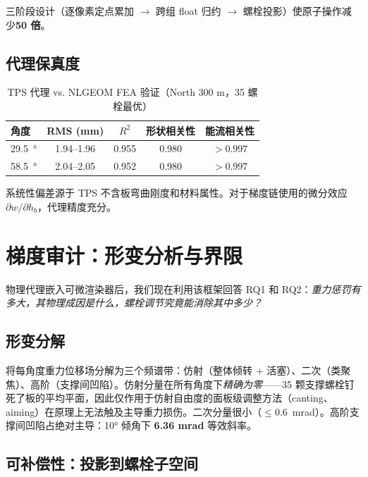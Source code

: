 \documentclass[12pt,a4paper]{ctexart}
\begin{document}
三阶段设计（逐像素定点累加 $\to$ 跨组 float 归约 $\to$ 螺栓投影）使原子操作减少\textbf{50 倍}。

\subsection{代理保真度}
\label{sec:proxy_fidelity}

\begin{table}[t]
\centering
\caption{TPS 代理 vs. NLGEOM FEA 验证（North 300 m，35 螺栓最优）}
\label{tab:proxy_fidelity}
\small
\begin{tabular}{lcccc}
\toprule
角度 & RMS (mm) & $R^2$ & 形状相关性 & 能流相关性 \\
\midrule
\SI{29.5}{\degree} & 1.94--1.96 & 0.955 & 0.980 & $>0.997$ \\
\SI{58.5}{\degree} & 2.04--2.05 & 0.952 & 0.980 & $>0.997$ \\
\bottomrule
\end{tabular}
\end{table}

系统性偏差源于 TPS 不含板弯曲刚度和材料属性。对于梯度链使用的微分效应 $\partial w / \partial h_b$，代理精度充分。

\section{梯度审计：形变分析与界限}
\label{sec:audit}

物理代理嵌入可微渲染器后，我们现在利用该框架回答 RQ1 和 RQ2：\emph{重力惩罚有多大，其物理成因是什么，螺栓调节究竟能消除其中多少？}

\subsection{形变分解}

将每角度重力位移场分解为三个频谱带：仿射（整体倾转 $+$ 活塞）、二次（类聚焦）、高阶（支撑间凹陷）。仿射分量在所有角度下\emph{精确为零}——35 颗支撑螺栓钉死了板的平均平面，因此仅作用于仿射自由度的面板级调整方法（canting、aiming）在原理上无法触及主导重力损伤。二次分量很小（$\le 0.6$~mrad）。高阶支撑间凹陷占绝对主导：10° 倾角下 \textbf{6.36 mrad} 等效斜率。

\subsection{可补偿性：投影到螺栓子空间}
\end{document}
